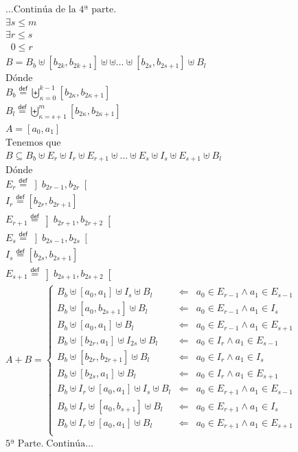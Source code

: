 \documentclass[final,12pt,a4paper,twoside,fleqn]{extbook}
\newcommand{\mathdef}{\ensuremath{\stackrel{\mathsf{def}}{{}={}}}}
\theoremstyle{definition}
\theoremstyle{remark}
\begin{document}
\begin{eqnarray}
\nonumber
&&\ldots\text{Continúa de la 4ª parte.}\\ \nonumber
&&\exists s \leq m\\
&&\exists r \leq s\\
&&\;\;    0 \leq r\\
&&B = B_b                                \uplus 
    \left[b_{2k},b_{2k+1}\right]       \uplus %
    \uplus \ldots \uplus
    \left[b_{2s},b_{2s+1}\right]       \uplus %
    B_l\\ \nonumber
&&\text{Dónde }\\
&&B_b \mathdef 
{{\biguplus}_{\kappa=0}^{k-1}}{\left[{b_{2\kappa},b_{2\kappa+1}}\right]}\\
&&B_l \mathdef 
{{\biguplus}_{\kappa=s+1}^{m}}{\left[{b_{2\kappa},b_{2\kappa+1}}\right]}\\
&&A = \left[ a_0 , a_1 \right]\\
&&\text{Tenemos que  }\\
&&B \subseteq B_b \uplus E_{r} \uplus I_{r} \uplus
E_{r+1} \uplus \ldots \uplus E_{s} \uplus I_{s} \uplus E_{s+1} \uplus B_l\\
&&\text{Dónde }\\
&&E_{r} \mathdef \left]b_{2r-1},b_{2r}\right[\\
&&I_{r} \mathdef \left[b_{2r},b_{2r+1}\right]\\
&&E_{r+1} \mathdef \left]b_{2r+1},b_{2r+2}\right[\\
&&E_{s} \mathdef \left]b_{2s-1},b_{2s}\right[\\
&&I_{s} \mathdef \left[b_{2s},b_{2s+1}\right]\\
&&E_{s+1} \mathdef \left]b_{2s+1},b_{2s+2}\right[\\
&&A+B = \left\lbrace \begin{matrix}
B_b \uplus [a_0,a_1] \uplus I_{s} \uplus B_l &\Leftarrow& a_0 \in E_{r-1} \wedge a_1 \in E_{s-1}\\
B_b \uplus [a_0,b_{2s+1}] \uplus B_l &\Leftarrow& a_0 \in E_{r-1} \wedge a_1 \in I_{s}\\
B_b \uplus [a_0,a_1] \uplus B_l &\Leftarrow& a_0 \in E_{r-1} \wedge a_1 \in E_{s+1}\\
B_b \uplus [b_{2r},a_1] \uplus I_{2s} \uplus B_l &\Leftarrow& a_0 \in I_{r}  \wedge a_1 \in E_{s-1}\\
B_b \uplus [b_{2r},b_{2r+1}] \uplus B_l &\Leftarrow& a_0 \in I_{r} \wedge a_1 \in I_{s}\\
B_b \uplus [b_{2s},a_1] \uplus B_l &\Leftarrow& a_0 \in I_{r}   \wedge a_1 \in E_{s+1}\\
B_b \uplus I_{r} \uplus [a_0,a_1] \uplus I_{s} \uplus B_l &\Leftarrow& a_0 \in E_{r+1} \wedge a_1 \in E_{s-1}\\
B_b \uplus I_{r} \uplus [a_0,b_{s+1}] \uplus B_l &\Leftarrow& a_0 \in E_{r+1} \wedge a_1 \in I_{s}\\
B_b \uplus I_{r} \uplus [a_0,a_1] \uplus B_l &\Leftarrow& a_0 \in E_{r+1} \wedge a_1 \in E_{s+1}\\ 
\end{matrix}\right.\\ \nonumber
&&\text{5ª Parte.}\;\text{Continúa}\ldots
\end{eqnarray}
\end{document}
